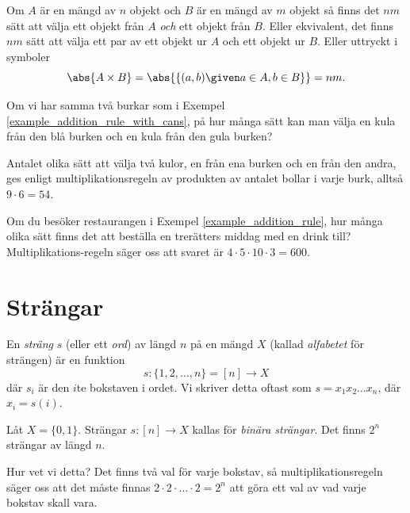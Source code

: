 \documentclass{tufte-handout}
\begin{document}
\begin{definition}
	Om $A$ är en mängd av $n$ objekt och $B$ är en mängd av $m$ objekt så finns det $nm$ sätt att välja ett objekt från $A$ \emph{och} ett objekt från $B$. Eller ekvivalent, det finns $nm$ sätt att välja ett par av ett objekt ur $A$ och ett objekt ur $B$. Eller uttryckt i symboler
$$\abs{A\times B} = \abs{\{(a,b) \given a \in A, b \in B\}} = nm.$$
\end{definition}

\begin{example}
    Om vi har samma två burkar som i Exempel \ref{example_addition_rule_with_cans}, på hur många sätt kan man välja en kula från den blå burken och en kula från den gula burken?
	
    Antalet olika sätt att välja två kulor, en från ena burken och en från den andra, ges enligt multiplikationsregeln av produkten av antalet bollar i varje burk, alltså $9\cdot 6 = 54$.   
\end{example}

\begin{example}
	Om du besöker restaurangen i Exempel \ref{example_addition_rule}, hur många olika sätt finns det att beställa en trerätters middag med en drink till? Multiplikations-regeln säger oss att svaret är $4\cdot 5\cdot 10\cdot 3 = 600$.
\end{example}

\section{Strängar}

\begin{definition}
	En \emph{sträng} $s$ (eller ett \emph{ord}) av längd $n$ på en mängd $X$ (kallad \emph{alfabetet} för strängen) är en funktion
	$$s: \{1, 2, \ldots, n\} = [n] \to X$$
	där $s_i$ är den $i$te bokstaven i ordet.
	Vi skriver detta oftast som $s = x_1x_2\ldots x_n$, där $x_i = s(i)$.
\end{definition}

\begin{example}
	Låt $X = \{0,1\}$. Strängar $s: [n] \to X$ kallas för \emph{binära strängar}. Det finns $2^n$ strängar av längd $n$.

	Hur vet vi detta? Det finns två val för varje bokstav, så multiplikationsregeln säger oss att det måste finnas $2\cdot 2\cdot\ldots\cdot 2 = 2^n$ att göra ett val av vad varje bokstav skall vara.
\end{example}
\end{document}
